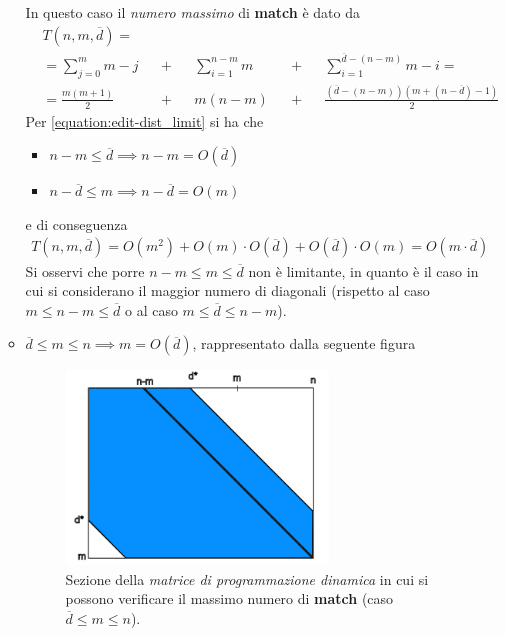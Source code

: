 \begin{itemize}
\begin{itemize}
                In questo caso il \emph{numero massimo} di \textbf{match} è dato da
                \begin{align*}
                    &T(n, m, \overline{d}) = \\ 
                    &= \sum_{j=0}^{m}{m-j}& &+& &\sum_{i=1}^{n-m}{m}& &+& &\sum_{i=1}^{\overline{d}-(n-m)}{m-i} = \\
                    &= \frac{m(m+1)}{2}& &+& &m(n-m)& &+& &\frac{(\overline{d}-(n-m)) (m+(n-\overline{d})-1)}{2}
                \end{align*}
                Per \ref{equation:edit-dist_limit} si ha che
                \begin{itemize}
                    \item $n-m \leq \overline{d} \implies n-m = O(\overline{d})$
                    \item  $n - \overline{d} \leq m \implies n-\overline{d} = O(m)$
                \end{itemize}
                e di conseguenza
                \begin{align*}
                    T(n, m, \overline{d}) = O(m^2) + O(m) \cdot O(\overline{d}) + O(\overline{d}) \cdot O(m) = O(m \cdot \overline{d})
                \end{align*}
                Si osservi che porre $n-m \leq m \leq \overline{d}$ non è limitante, in quanto è il caso in cui si considerano il maggior numero di diagonali (rispetto al caso $m \leq n-m \leq \overline{d}$ o al caso $m \leq \overline{d} \leq n-m$).
            
            \item $\overline{d} \leq m \leq n \implies m = O(\overline{d})$, rappresentato dalla seguente figura
            \vspace{20pt}
                \begin{figure}[h]
                    \centering
                    \includegraphics[width=0.7\textwidth]{images/wfa_extend_matrix_2.png}
                    \caption{Sezione della \emph{matrice di programmazione dinamica} in cui si possono verificare il massimo numero di \textbf{match} (caso $\overline{d} \leq m \leq n$).}
                    \label{fig:wf_extend_matrix_2}
                \end{figure}
                

\end{itemize}
\end{itemize}
